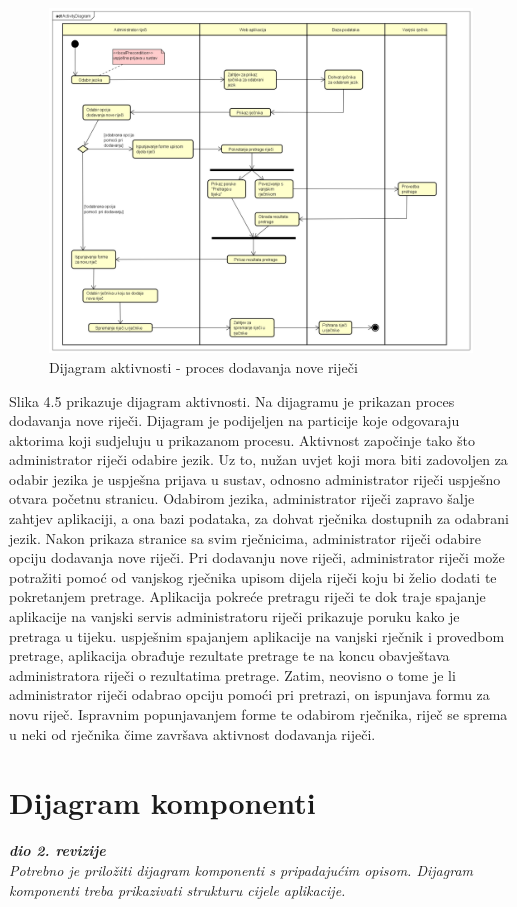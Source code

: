 			
			
			\begin{figure}[H]
				\includegraphics[width=\textwidth]{slike/ActivityDiagram.PNG}
				\caption{Dijagram aktivnosti - proces dodavanja nove riječi}
				\label{fig:activityDiagram}
			\end{figure}
			
			\newpage
			
			Slika 4.5 prikazuje dijagram aktivnosti. Na dijagramu je prikazan proces dodavanja nove riječi. Dijagram je podijeljen na particije koje odgovaraju aktorima koji sudjeluju u prikazanom procesu. Aktivnost započinje tako što administrator riječi odabire jezik. Uz to, nužan uvjet koji mora biti zadovoljen za odabir jezika je uspješna prijava u sustav, odnosno administrator riječi uspješno otvara početnu stranicu. Odabirom jezika, administrator riječi zapravo šalje zahtjev aplikaciji, a ona bazi podataka, za dohvat rječnika dostupnih za odabrani jezik. Nakon prikaza stranice sa svim rječnicima, administrator riječi odabire opciju dodavanja nove riječi. Pri dodavanju nove riječi, administrator riječi može potražiti pomoć od vanjskog rječnika upisom dijela riječi koju bi želio dodati te pokretanjem pretrage. Aplikacija pokreće pretragu riječi te dok traje spajanje aplikacije na vanjski servis administratoru riječi prikazuje poruku kako je pretraga u tijeku. uspješnim spajanjem aplikacije na vanjski rječnik i provedbom pretrage, aplikacija obrađuje rezultate pretrage te na koncu obavještava administratora riječi o rezultatima pretrage. Zatim, neovisno o tome je li administrator riječi odabrao opciju pomoći pri pretrazi, on ispunjava formu za novu riječ. Ispravnim popunjavanjem forme te odabirom rječnika, riječ se sprema u neki od rječnika čime završava aktivnost dodavanja riječi.
			
			\eject
		\section{Dijagram komponenti}
		
			\textbf{\textit{dio 2. revizije}}\\
		
			 \textit{Potrebno je priložiti dijagram komponenti s pripadajućim opisom. Dijagram komponenti treba prikazivati strukturu cijele aplikacije.}